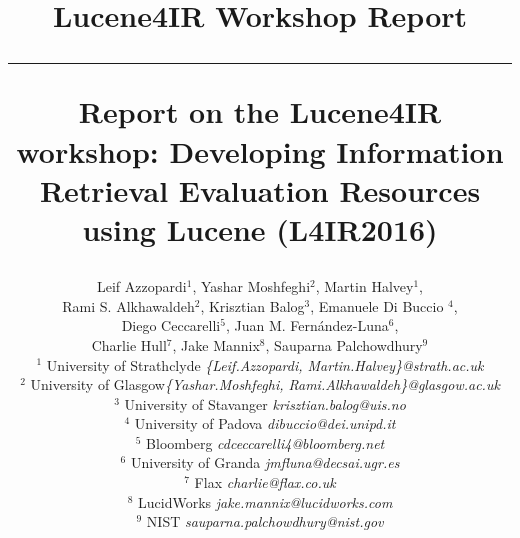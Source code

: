 \documentclass[12pt]{article}
\begin{document}
\title{\vspace{-2.5cm}
\begin{center}
\textbf{\small{Lucene4IR Workshop Report}}\\\vspace{-0.5cm} \rule{17.5cm}{1pt}
\end{center}
\vspace{1cm}\textbf{Report on the Lucene4IR workshop: Developing Information Retrieval Evaluation Resources using Lucene (L4IR2016) }}

\newcommand{\todo}[1]{\textcolor{red}{#1}}
\author{
Leif Azzopardi$^{1}$, Yashar Moshfeghi$^{2}$, Martin Halvey$^{1}$, \\
 Rami S. Alkhawaldeh$^{2}$, Krisztian Balog$^{3}$, Emanuele Di Buccio $^{4}$, \\
Diego Ceccarelli$^{5}$, Juan M. Fern\'andez-Luna$^{6}$,\\
 Charlie Hull$^{7}$, Jake Mannix$^{8}$, Sauparna Palchowdhury$^{9}$\\ 
    $^{1}$ {\small University of Strathclyde  \emph{ \{Leif.Azzopardi, Martin.Halvey\}@strath.ac.uk}}\\
    $^{2}$ {\small University of Glasgow\emph{\small {\{Yashar.Moshfeghi, Rami.Alkhawaldeh\}@glasgow.ac.uk}}}\\
	$^{3}$ {\small University of Stavanger \emph{\small krisztian.balog@uis.no}}\\
	$^{4}$ {\small University of Padova \emph{\small dibuccio@dei.unipd.it}}\\
	$^{5}$ {\small Bloomberg \emph{\small cdceccarelli4@bloomberg.net}}\\	
	$^{6}$ {\small University of Granda \emph{\small jmfluna@decsai.ugr.es}}\\
	$^{7}$ {\small Flax \emph{\small charlie@flax.co.uk}}\\
	$^{8}$ {\small LucidWorks \emph{\small jake.mannix@lucidworks.com}}\\
	$^{9}$ {\small NIST \emph{\small sauparna.palchowdhury@nist.gov}}
}
\end{document}
